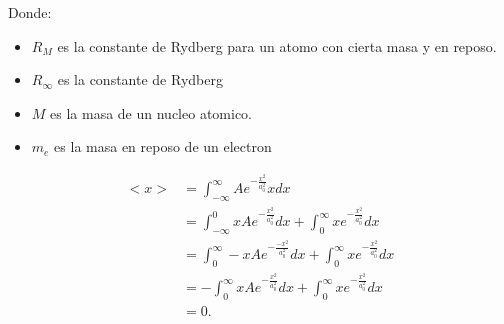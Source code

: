 \documentclass{report}
\begin{document}
Donde:
\begin{itemize}
  \item $R_M$ es la constante de Rydberg para un atomo con cierta masa y en reposo.
  \item $R_\infty$ es la constante de Rydberg
  \item $M$ es la masa de un nucleo atomico.
  \item $m_e$ es la masa en reposo de un electron
\end{itemize}

\begin{align*}
  <x> &= \int_{-\infty}^{\infty} Ae^{-\frac{x^2}{a_0^2}}x dx\\
      &= \int_{-\infty}^{0} x Ae^{-\frac{x^2}{a_0^2}} dx + \int_{0}^{\infty} x e^{- \frac{x^2}{a_0^2}}dx\\
      &= \int_{0}^{\infty} - x Ae^{-\frac{-x^2}{a_0^2}} dx + \int_{0}^{\infty} x e^{- \frac{x^2}{a_0^2}}dx\\
      &= - \int_{0}^{\infty} x Ae^{-\frac{x^2}{a_0^2}} dx + \int_{0}^{\infty} x e^{- \frac{x^2}{a_0^2}}dx\\
      &= 0
.\end{align*}
\end{document}
